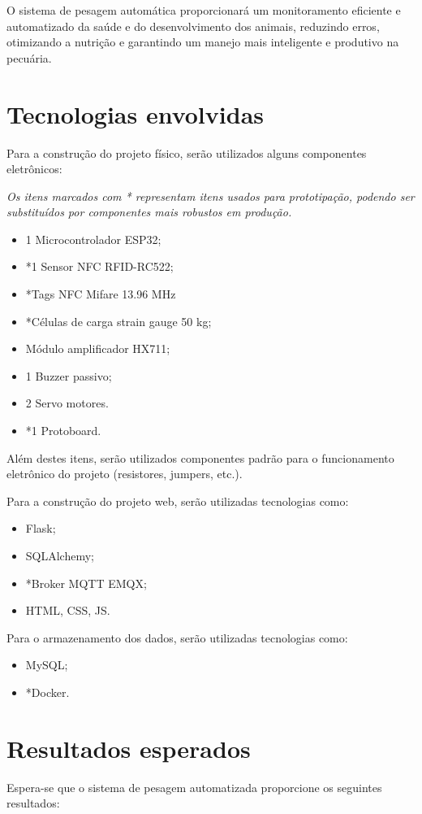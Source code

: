 \documentclass[11pt]{article}
\begin{document}
O sistema de pesagem automática proporcionará um monitoramento eficiente e automatizado da saúde e do desenvolvimento dos animais, reduzindo erros, otimizando a nutrição e garantindo um manejo mais inteligente e produtivo na pecuária.

\section{Tecnologias envolvidas}
Para a construção do projeto físico, serão utilizados alguns componentes eletrônicos:

\textit{Os itens marcados com * representam itens usados para prototipação, podendo ser substituídos por componentes mais robustos em produção.}

\begin{itemize}
    \item 1 Microcontrolador ESP32;
    \item *1 Sensor NFC RFID-RC522;
    \item *Tags NFC Mifare 13.96 MHz
    \item *Células de carga strain gauge 50 kg;
    \item Módulo amplificador HX711;
    \item 1 Buzzer passivo;
    \item 2 Servo motores.
    \item *1 Protoboard.
\end{itemize}

Além destes itens, serão utilizados componentes padrão para o funcionamento eletrônico do projeto (resistores, jumpers, etc.).

Para a construção do projeto web, serão utilizadas tecnologias como:
\begin{itemize}
    \item Flask;
    \item SQLAlchemy;
    \item *Broker MQTT EMQX;
    \item HTML, CSS, JS.
\end{itemize}

Para o armazenamento dos dados, serão utilizadas tecnologias como:
\begin{itemize}
    \item MySQL;
    \item *Docker.
\end{itemize}


\section{Resultados esperados}
Espera-se que o sistema de pesagem automatizada proporcione os seguintes resultados:
\end{document}
